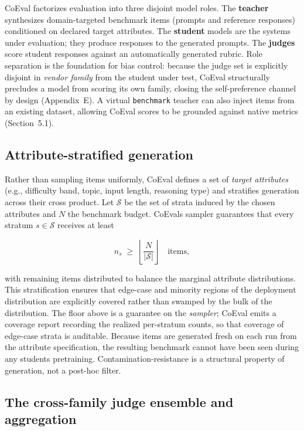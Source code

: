 CoEval factorizes evaluation into three disjoint model roles. The \textbf{teacher} synthesizes domain-targeted
benchmark items (prompts and reference responses) conditioned on declared target attributes. The \textbf{student}
models are the systems under evaluation; they produce responses to the generated prompts. The \textbf{judges}
score student responses against an automatically generated rubric. Role separation is the foundation for bias control:
because the judge set is explicitly disjoint in \emph{vendor family} from the student under test, CoEval structurally
precludes a model from scoring its own family, closing the self-preference channel by design (Appendix~E). A
virtual \texttt{benchmark} teacher can also
inject items from an existing dataset, allowing CoEval scores to be grounded against native metrics (Section~5.1).

\subsection{Attribute-stratified generation}\label{attribute-stratified-generation}

Rather than sampling items uniformly, CoEval defines a set of \emph{target attributes} (e.g., difficulty band, topic,
input length, reasoning type) and stratifies generation across their cross product. Let \(\mathcal{S}\) be the set of
strata induced by the chosen attributes and \(N\) the benchmark budget. CoEval\textquotesingle s sampler guarantees that every stratum
\(s \in \mathcal{S}\) receives at least

\[n_s \;\ge\; \left\lfloor \frac{N}{|\mathcal{S}|} \right\rfloor \quad \text{items},\]

with remaining items distributed to balance the marginal attribute distributions. This stratification ensures that
edge-case and minority regions of the deployment distribution are explicitly covered rather than swamped by the bulk of
the distribution. The floor above is a guarantee on the \emph{sampler}; CoEval emits a coverage report recording the realized per-stratum counts, so that coverage of edge-case strata is auditable. Because items are generated fresh on
each run from the attribute specification, the resulting benchmark cannot have been seen during any student\textquotesingle s
pretraining. Contamination-resistance is a structural property of generation, not a post-hoc filter.

\subsection{The cross-family judge ensemble and aggregation}\label{the-cross-family-judge-ensemble-and-aggregation}

